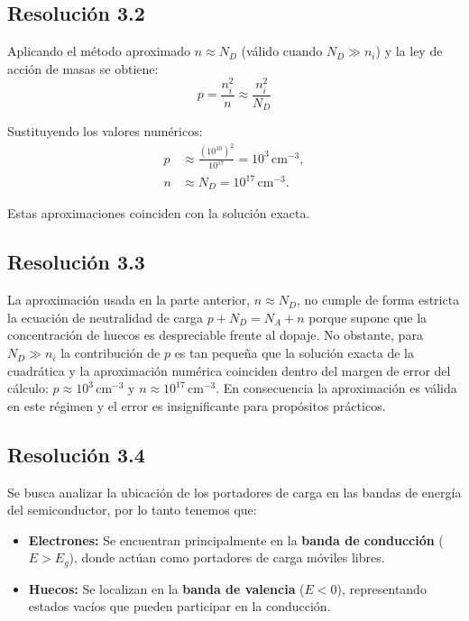 \documentclass[
  11pt,
  letterpaper,
   addpoints,
   answers
  ]{exam}
\begin{document}
\begin{questions}
\begin{solution}
\subsection*{Resolución 3.2}
    Aplicando el método aproximado $n \approx N_D$ (válido cuando $N_D\gg n_i$) y la ley de acción de masas se obtiene:
    \begin{equation}
        p = \frac{n_i^2}{n} \approx \frac{n_i^2}{N_D}
    \end{equation}

    Sustituyendo los valores numéricos:
    \begin{align}
        p &\approx \frac{(10^{10})^2}{10^{17}} = 10^{3}\,\mathrm{cm^{-3}}, \\
        n &\approx N_D = 10^{17}\,\mathrm{cm^{-3}}.
    \end{align}

    Estas aproximaciones coinciden con la solución exacta.
\subsection*{Resolución 3.3}

    La aproximación usada en la parte anterior, $n\approx N_D$, no cumple de forma estricta la ecuación de neutralidad de carga $p+N_D=N_A+n$ porque supone que la concentración de huecos es despreciable frente al dopaje. No obstante, para $N_D\gg n_i$ la contribución de $p$ es tan pequeña que la solución exacta de la cuadrática y la aproximación numérica coinciden dentro del margen de error del cálculo: $p\approx10^{3}\,\mathrm{cm^{-3}}$ y $n\approx10^{17}\,\mathrm{cm^{-3}}$. En consecuencia la aproximación es válida en este régimen y el error es insignificante para propósitos prácticos.
\subsection*{Resolución 3.4}
Se busca analizar la ubicación de los portadores de carga en las bandas de energía del semiconductor, por lo tanto tenemos que:
    \begin{itemize}
        \item \textbf{Electrones:} Se encuentran principalmente en la \textbf{banda de conducción} ($E > E_g$), donde actúan como portadores de carga móviles libres.
        \item \textbf{Huecos:} Se localizan en la \textbf{banda de valencia} ($E < 0$), representando estados vacíos que pueden participar en la conducción.
    \end{itemize}


\end{solution}
\end{questions}
\end{document}
